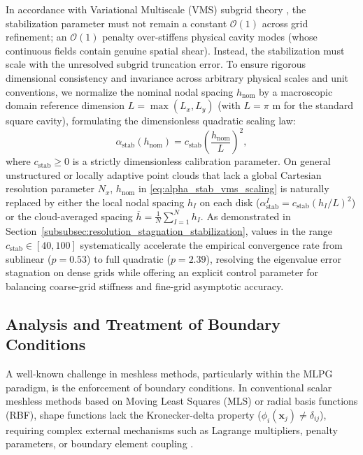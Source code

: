 \documentclass[preprint,12pt]{elsarticle}
\begin{document}
In accordance with Variational Multiscale (VMS) subgrid theory \cite{hughes1998variational, codina2000stabilization}, the stabilization parameter must not remain a constant $\mathcal{O}(1)$ across grid refinement; an $\mathcal{O}(1)$ penalty over-stiffens physical cavity modes (whose continuous fields contain genuine spatial shear). Instead, the stabilization must scale with the unresolved subgrid truncation error. To ensure rigorous dimensional consistency and invariance across arbitrary physical scales and unit conventions, we normalize the nominal nodal spacing $h_{\mathrm{nom}}$ by a macroscopic domain reference dimension $L = \max(L_x, L_y)$ (with $L = \pi\text{ m}$ for the standard square cavity), formulating the dimensionless quadratic scaling law:
\begin{equation}
    \alpha_{\mathrm{stab}}(h_{\mathrm{nom}}) = c_{\mathrm{stab}} \left(\frac{h_{\mathrm{nom}}}{L}\right)^2,
    \label{eq:alpha_stab_vms_scaling}
\end{equation}
where $c_{\mathrm{stab}} \ge 0$ is a strictly dimensionless calibration parameter. On general unstructured or locally adaptive point clouds that lack a global Cartesian resolution parameter $N_x$, $h_{\mathrm{nom}}$ in \eqref{eq:alpha_stab_vms_scaling} is naturally replaced by either the local nodal spacing $h_I$ on each disk ($\alpha_{\mathrm{stab}}^I = c_{\mathrm{stab}} (h_I / L)^2$) or the cloud-averaged spacing $\overline{h} = \frac{1}{N}\sum_{I=1}^N h_I$. As demonstrated in Section~\ref{subsubsec:resolution_stagnation_stabilization}, values in the range $c_{\mathrm{stab}} \in [40, 100]$ systematically accelerate the empirical convergence rate from sublinear ($p = 0.53$) to full quadratic ($p = 2.39$), resolving the eigenvalue error stagnation on dense grids while offering an explicit control parameter for balancing coarse-grid stiffness and fine-grid asymptotic accuracy.

\subsection{Analysis and Treatment of Boundary Conditions}
\label{subsec:boundary_treatment}

A well-known challenge in meshless methods, particularly within the MLPG paradigm, is the enforcement of boundary conditions. In conventional scalar meshless methods based on Moving Least Squares (MLS) or radial basis functions (RBF), shape functions lack the Kronecker-delta property ($\phi_i(\mathbf{x}_j) \ne \delta_{ij}$), requiring complex external mechanisms such as Lagrange multipliers, penalty parameters, or boundary element coupling \cite{atluri2002meshless}.
\end{document}
